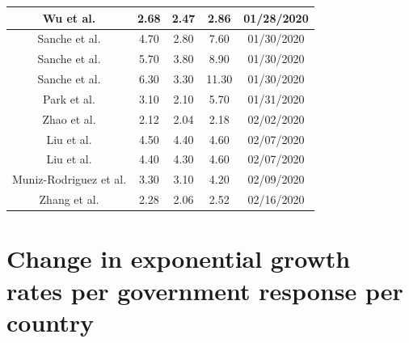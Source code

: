 \documentclass{article}
\begin{document}
\begin{center}
\begin{tabular}{|c|c|c|c|c|}
Wu et al. \cite{Joseph} & 2.68 & 2.47 & 2.86 & 01/28/2020 \\ \hline
Sanche et al. \cite{Sanche} & 4.70 & 2.80 & 7.60 & 01/30/2020 \\ \hline
Sanche et al. \cite{Sanche} & 5.70 & 3.80 & 8.90 & 01/30/2020 \\ \hline
Sanche et al. \cite{Sanche} & 6.30 & 3.30 & 11.30 & 01/30/2020 \\ \hline
Park et al. \cite{Park} & 3.10 & 2.10 & 5.70 & 01/31/2020 \\ \hline
Zhao et al. \cite{Zhao} & 2.12 & 2.04 & 2.18 & 02/02/2020 \\ \hline
Liu et al. \cite{Liu2} & 4.50 & 4.40 & 4.60 & 02/07/2020 \\ \hline
Liu et al. \cite{Liu2} & 4.40 & 4.30 & 4.60 & 02/07/2020 \\ \hline
Muniz-Rodriguez et al. \cite{Muniz} & 3.30 & 3.10 & 4.20 & 02/09/2020 \\ \hline
Zhang et al. \cite{Zhang} & 2.28 & 2.06 & 2.52 & 02/16/2020 \\ \hline
\end{tabular}
\end{center}

\section{Change in exponential growth rates per government response per country}
\begin{center}
\begin{table}
  \label{table:exponential_growth_rate_changes}
  \begin{adjustbox}{width=\linewidth}
  \end{adjustbox}
\end{table}
\end{center}
\end{document}
